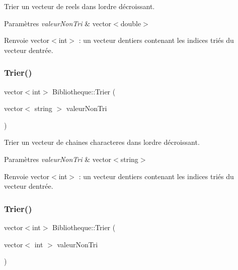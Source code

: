 Trier un vecteur de reels dans l\textquotesingle{}ordre décroissant. 


\begin{DoxyParams}{Paramètres}
{\em valeur\+Non\+Tri} & vector$<$double$>$ \\
\hline
\end{DoxyParams}
\begin{DoxyReturn}{Renvoie}
vector$<$int$>$ \+: un vecteur d\textquotesingle{}entiers contenant les indices triés du vecteur d\textquotesingle{}entrée. 
\end{DoxyReturn}
\mbox{\label{classBibliotheque_af95534b5f7fba8f1a6dcd1215bd55f96}} 
\subsubsection{\texorpdfstring{Trier()}{Trier()}\hspace{0.1cm}{\footnotesize\ttfamily [3/4]}}
{\footnotesize\ttfamily vector$<$int$>$ Bibliotheque\+::\+Trier (\begin{DoxyParamCaption}\item[{vector$<$ string $>$}]{valeur\+Non\+Tri }\end{DoxyParamCaption})}



Trier un vecteur de chaines characteres dans l\textquotesingle{}ordre décroissant. 


\begin{DoxyParams}{Paramètres}
{\em valeur\+Non\+Tri} & vector$<$string$>$ \\
\hline
\end{DoxyParams}
\begin{DoxyReturn}{Renvoie}
vector$<$int$>$ \+: un vecteur d\textquotesingle{}entiers contenant les indices triés du vecteur d\textquotesingle{}entrée. 
\end{DoxyReturn}
\mbox{\label{classBibliotheque_a0a0c1d628bfa840f764d4ec483f4b1e6}} 
\subsubsection{\texorpdfstring{Trier()}{Trier()}\hspace{0.1cm}{\footnotesize\ttfamily [4/4]}}
{\footnotesize\ttfamily vector$<$int$>$ Bibliotheque\+::\+Trier (\begin{DoxyParamCaption}\item[{vector$<$ int $>$}]{valeur\+Non\+Tri }\end{DoxyParamCaption})}




